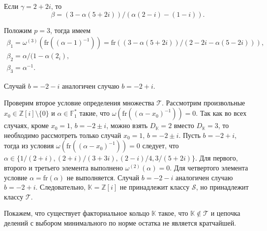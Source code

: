 \documentclass[_00_dissertation.tex]{subfiles}
\begin{document}
\begin{example}
    Если $\gamma=2+2i$, то
    \begin{equation*}
        \beta=(3-\alpha(5+2i))/(\alpha(2-i)-(1-i)).
    \end{equation*}

    Положим $p=3$, тогда имеем
    \begin{equation*}
        \begin{array}{c}
            \beta_1=\omega^{(3)}(\textrm{fr}((\alpha-1)^{-1}))=\textrm{fr}((3-\alpha(5+2i))/(2-2i-\alpha(5-2i))),\\
            \beta_2=\alpha/(1-\alpha(2_i),\\
            \beta_3=\alpha^{-1}.
        \end{array}
    \end{equation*}

    Случай $b=-2-i$ аналогичен случаю $b=-2+i$.

    Проверим второе условие определения множества $\mathcal{T}$.
    Рассмотрим произвольные $x_0\in\mathbb{Z}[i]\setminus\{0\}$ и $\alpha\in\mathbb{F}^*_1$ такие, что $\omega(\textrm{fr}((\alpha-x_0)^{-1}))=0$.
    Так как во всех случаях, кроме $x_0=1$, $b=-2\pm i$, можно взять $D_{\mathbb{K}}=2$ вместо $D_{\mathbb{K}}=3$, то необходимо рассмотреть только случай $x_0=1$, $b=-2\pm i$.
    Пусть $b=-2+i$, тогда из условия $\omega(\textrm{fr}((\alpha-x_0)^{-1}))=0$ следует, что $\alpha\in\{1/(2+i),(2+i)/(3+3i),(2-i)/4,3/(5+2i)\}$.
    Для первого, второго и третьего элемента выполнено $\omega^{(2)}(\alpha)=0$.
    Для четвертого элемента условие $\alpha=\textrm{fr}(\alpha)$ не выполняется.
    Случай $b=-2-i$ аналогичен случаю $b=-2+i$.
    Следовательно, $\mathbb{K}=\mathbb{Z}[i]$ не принадлежит классу $\mathcal{S}$, но принадлежит классу $\mathcal{T}$.
\end{example}

Покажем, что существует факториальное кольцо $\mathbb{K}$ такое, что $\mathbb{K}\not\in\mathcal{T}$ и цепочка делений с выбором минимального по норме остатка не является кратчайшей.
\end{document}
